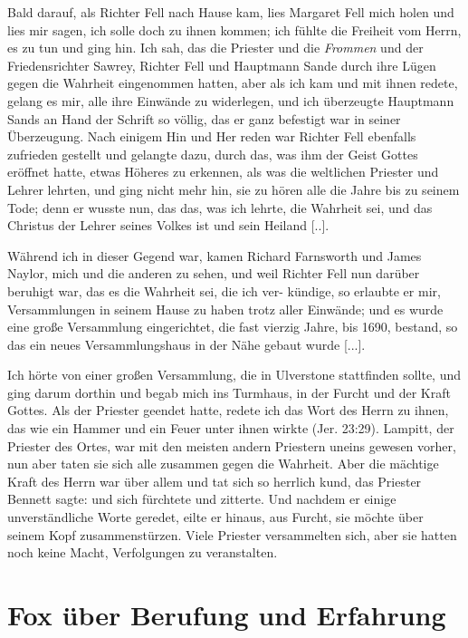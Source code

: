 Bald darauf, als Richter Fell nach Hause kam, lies Margaret
Fell mich holen und lies mir sagen, ich solle doch zu ihnen
kommen; ich fühlte die Freiheit vom Herrn, es zu tun und ging
hin. Ich sah, das die Priester und die \textit{Frommen} und der
Friedensrichter Sawrey, Richter Fell und Hauptmann Sande durch
ihre Lügen gegen die Wahrheit eingenommen hatten, aber als ich
kam und mit ihnen redete, gelang es mir, alle ihre Einwände zu
widerlegen, und ich überzeugte Hauptmann Sands an Hand der
Schrift so völlig, das er ganz befestigt war in seiner Überzeugung.
Nach einigem Hin und Her reden war Richter Fell ebenfalls 
zufrieden gestellt und gelangte dazu, durch das, was ihm der Geist
Gottes eröffnet hatte, etwas Höheres zu erkennen, als was die
weltlichen Priester und Lehrer lehrten, und ging nicht mehr hin,
sie zu hören alle die Jahre bis zu seinem Tode; denn er wusste
nun, das das, was ich lehrte, die Wahrheit sei, und das Christus
der Lehrer seines Volkes ist und sein Heiland [..]. 

Während ich
in dieser Gegend war, kamen Richard 
Farnsworth und James
Naylor, mich und die anderen 
zu sehen, und weil Richter Fell
nun darüber beruhigt war, das es die Wahrheit sei, die ich ver-
kündige, so erlaubte er mir, Versammlungen in seinem Hause zu
haben trotz aller Einwände; und es wurde eine große Versammlung 
eingerichtet, die fast vierzig Jahre, bis 
1690, bestand, so
das ein neues Versammlungshaus 
in der Nähe gebaut wurde [...].

Ich hörte von einer großen Versammlung, die in Ulverstone
stattfinden sollte, und ging darum dorthin und begab mich ins
Turmhaus, in der Furcht und der Kraft Gottes. Als der Priester
geendet hatte, redete ich das Wort des Herrn zu ihnen, das wie ein
Hammer und ein Feuer unter ihnen wirkte 
(Jer. 23:29). Lampitt,
der Priester des Ortes, war mit den meisten andern Priestern
uneins gewesen vorher, nun aber taten sie sich alle zusammen
gegen die Wahrheit. Aber die mächtige Kraft des Herrn war
über allem und tat sich so herrlich kund, das Priester Bennett
sagte:  und sich 
fürchtete und zitterte. Und
nachdem er einige unverständliche Worte geredet, eilte er hinaus,
aus Furcht, sie möchte über seinem Kopf zusammenstürzen. Viele
Priester versammelten sich, aber sie hatten noch keine Macht, 
Verfolgungen zu veranstalten.

\section{Fox über Berufung und Erfahrung}

